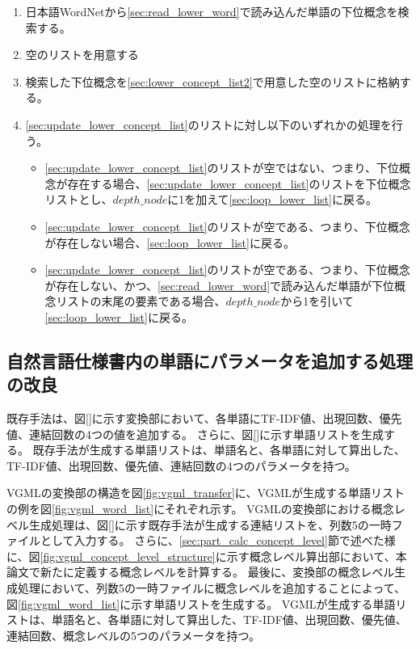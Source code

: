 \begin{enumerate}
\begin{enumerate}
\begin{enumerate}
                    \item 日本語WordNetから\ref{sec:read_lower_word}で読み込んだ単語の下位概念を検索する。
                    \item 空のリストを用意する
                    \label{sec:lower_concept_list2}
                    \item 検索した下位概念を\ref{sec:lower_concept_list2}で用意した空のリストに格納する。
                    \label{sec:update_lower_concept_list}
                    \item \ref{sec:update_lower_concept_list}のリストに対し以下のいずれかの処理を行う。
                    \begin{itemize}
                        \item \ref{sec:update_lower_concept_list}のリストが空ではない、つまり、下位概念が存在する場合、\ref{sec:update_lower_concept_list}のリストを下位概念リストとし、$depth\_node$に1を加えて\ref{sec:loop_lower_list}に戻る。
                        \item \ref{sec:update_lower_concept_list}のリストが空である、つまり、下位概念が存在しない場合、\ref{sec:loop_lower_list}に戻る。
                        \item \ref{sec:update_lower_concept_list}のリストが空である、つまり、下位概念が存在しない、かつ、\ref{sec:read_lower_word}で読み込んだ単語が下位概念リストの末尾の要素である場合、$depth\_node$から1を引いて\ref{sec:loop_lower_list}に戻る。
                    \end{itemize}
                \end{enumerate}
        \end{enumerate}
\end{enumerate}

\subsection{自然言語仕様書内の単語にパラメータを追加する処理の改良}
\label{sec:improve_word_list}
既存手法は、図\ref{}に示す変換部において、各単語にTF-IDF値、出現回数、優先値、連結回数の4つの値を追加する。
さらに、図\ref{}に示す単語リストを生成する。
既存手法が生成する単語リストは、単語名と、各単語に対して算出した、TF-IDF値、出現回数、優先値、連結回数の4つのパラメータを持つ。

VGMLの変換部の構造を図\ref{fig:vgml_transfer}に、VGMLが生成する単語リストの例を図\ref{fig:vgml_word_list}にそれぞれ示す。
VGMLの変換部における概念レベル生成処理は、図\ref{}に示す既存手法が生成する連結リストを、列数5の一時ファイルとして入力する。
さらに、\ref{sec:part_calc_concept_level}節で述べた様に、図\ref{fig:vgml_concept_level_structure}に示す概念レベル算出部において、本論文で新たに定義する概念レベルを計算する。
最後に、変換部の概念レベル生成処理において、列数5の一時ファイルに概念レベルを追加することによって、図\ref{fig:vgml_word_list}に示す単語リストを生成する。
VGMLが生成する単語リストは、単語名と、各単語に対して算出した、TF-IDF値、出現回数、優先値、連結回数、概念レベルの5つのパラメータを持つ。

